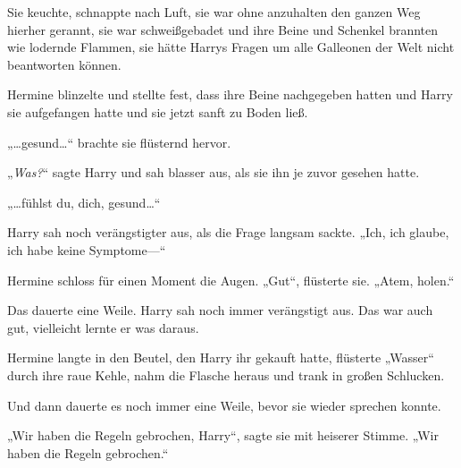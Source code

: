 Sie keuchte, schnappte nach Luft, sie war ohne anzuhalten den ganzen Weg hierher gerannt, sie war schweißgebadet und ihre Beine und Schenkel brannten wie lodernde Flammen, sie hätte Harrys Fragen um alle Galleonen der Welt nicht beantworten können.

Hermine blinzelte und stellte fest, dass ihre Beine nachgegeben hatten und Harry sie aufgefangen hatte und sie jetzt sanft zu Boden ließ.

„…gesund…“ brachte sie flüsternd hervor.

„\emph{Was?}“ sagte Harry und sah blasser aus, als sie ihn je zuvor gesehen hatte.

„…fühlst du, dich, gesund…“

Harry sah noch verängstigter aus, als die Frage langsam sackte. „Ich, ich glaube, ich habe keine Symptome—“

Hermine schloss für einen Moment die Augen. „Gut“, flüsterte sie. „Atem, holen.“

Das dauerte eine Weile. Harry sah noch immer verängstigt aus. Das war auch gut, vielleicht lernte er was daraus.

Hermine langte in den Beutel, den Harry ihr gekauft hatte, flüsterte „Wasser“ durch ihre raue Kehle, nahm die Flasche heraus und trank in großen Schlucken.

Und dann dauerte es noch immer eine Weile, bevor sie wieder sprechen konnte.

„Wir haben die Regeln gebrochen, Harry“, sagte sie mit heiserer Stimme. „Wir haben die Regeln gebrochen.“

